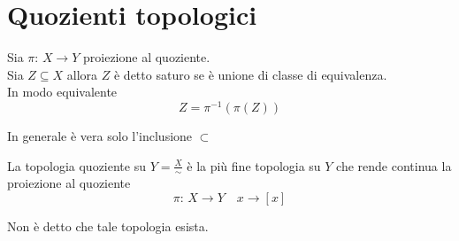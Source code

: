 \section{Quozienti topologici}
\begin{defn}\bianco
Sia $\pi:\, X \to Y$ proiezione al quoziente.\\
Sia $ Z\subseteq X $ allora $Z$ \`e detto saturo se \`e unione di classe di equivalenza.\\
In modo equivalente
$$ Z = \pi^{-1}(\pi(Z))$$
\end{defn}
\begin{oss}In generale \`e vera solo l'inclusione $\subset$
\end{oss}
\begin{defn}La topologia quoziente su $Y=\frac{X}{\sim}$ 
\`e la pi\`u fine topologia su $Y$ che rende continua la proiezione al quoziente $$\pi:\, X \to Y \quad x\to [x]$$

\end{defn}
\begin{oss}Non \`e detto che tale topologia esista.
\end{oss}


